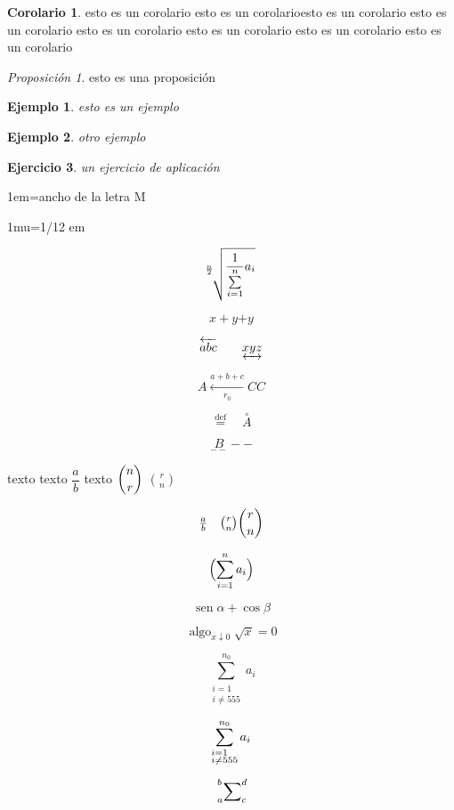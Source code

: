 \documentclass{report}
\DeclareMathOperator{\sen}{sen}
\DeclareMathOperator*{\algo}{algo}
\newtheorem{ej}{Ejemplo}
\newtheorem{ejr}[ej]{Ejercicio}
\theoremstyle{definition}
\newtheorem*{cor}{Corolario}
\theoremstyle{remark}
\newtheorem{prop}[teo]{Proposición}
\begin{document}
\begin{cor}
esto es un corolario	esto es un corolarioesto es un corolario esto es un corolario esto es un corolario esto es un corolario esto es un corolario esto es un corolario
\end{cor}

\begin{prop}
	esto es una proposición
\end{prop}

\begin{ej}
	esto es un ejemplo
\end{ej}

\begin{ej}
	otro ejemplo
\end{ej}

\begin{ejr}
	un ejercicio de aplicación
\end{ejr}	
	
	
	
	
	1em=ancho de la letra M
	
	1mu=1/12 em
	
$$
\sqrt[\uproot{6}\leftroot{8}\frac{n}{2}]{\frac{1}{\sum\limits_{i=1}^n}a_i}
$$	
	
$$
x+y\boxed{+y}
$$

$$
\overleftarrow{abc}\qquad\underleftrightarrow{xyz}
$$

$$
A\xleftarrow[r_0]{a+b+c}CC
$$

$$
\overset{\mathrm{def}}{=}\quad \overset{\circ}{A}
$$

$$
\underset{--}{B}--
$$

texto texto $\dfrac{a}{b}$ texto $\dbinom{n}{r}$ $\binom{r}{n}$

$$
\tfrac{a}{b}\quad\tbinom{r}{n}\binom{r}{n}
$$

$$
\Bigl(\sum_{i=1}^na_i\Bigr)
$$



$$
\sen \alpha+\cos\beta
$$

$$
\algo_{x\downarrow0}\sqrt{x}=0
$$

$$
\sum_{\substack{i=1\\i\neq555}}^{n_0} a_i
$$

$$
\sum_{\begin{subarray}{l}i=1\\i\neq555\end{subarray}}^{n_0} a_i
$$

$$
\sideset{_a^b}{_c^d}\sum
$$
\end{document}
